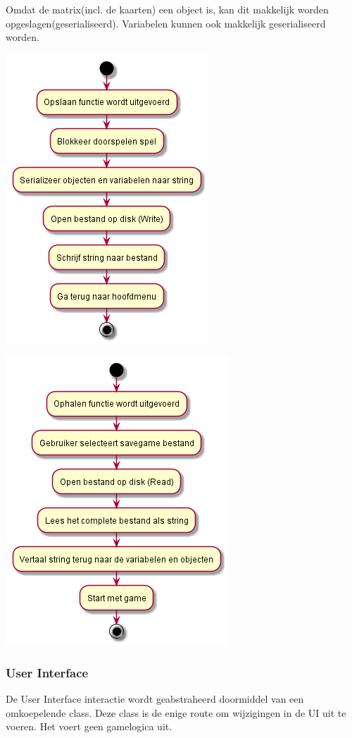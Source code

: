 \documentclass[a4paper,titlepage,11pt]{article}
\begin{document}
Omdat de matrix(incl. de kaarten) een object is,
kan dit makkelijk worden opgeslagen(geserialiseerd).
Variabelen kunnen ook makkelijk geserialiseerd worden.

\begin{center}
\includegraphics[width=.5\linewidth]{../Images/serialization.png}
\end{center}

\begin{center}
\includegraphics[width=.5\linewidth]{../Images/serialization2.png}
\end{center}

\subsubsection{User Interface}

De User Interface interactie wordt geabstraheerd doormiddel van een omkoepelende class.
Deze class is de enige route om wijzigingen in de UI uit te voeren.
Het voert geen gamelogica uit.
\end{document}
